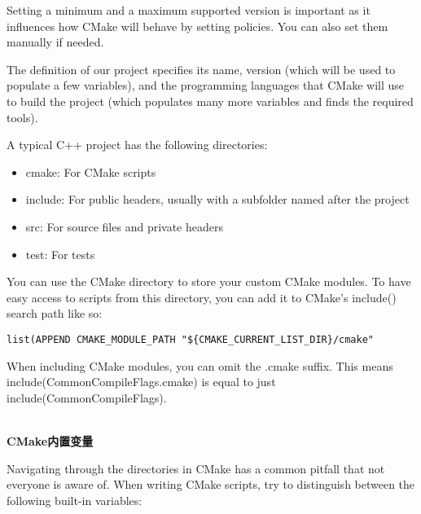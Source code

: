 Setting a minimum and a maximum supported version is important as it influences how CMake will behave by setting policies. You can also set them manually if needed.

The definition of our project specifies its name, version (which will be used to populate a few variables), and the programming languages that CMake will use to build the project (which populates many more variables and finds the required tools).

A typical C++ project has the following directories:

\begin{itemize}
\item 
cmake: For CMake scripts

\item 
include: For public headers, usually with a subfolder named after the project

\item 
src: For source files and private headers

\item 
test: For tests
\end{itemize}

You can use the CMake directory to store your custom CMake modules. To have easy access to scripts from this directory, you can add it to CMake's include() search path like so:

\begin{lstlisting}[style=styleCMake]
list(APPEND CMAKE_MODULE_PATH "${CMAKE_CURRENT_LIST_DIR}/cmake"
\end{lstlisting}

When including CMake modules, you can omit the .cmake suffix. This means include(CommonCompileFlags.cmake) is equal to just
include(CommonCompileFlags).

\hspace*{\fill} \\ %
\noindent
\textbf{CMake内置变量}

Navigating through the directories in CMake has a common pitfall that not everyone is aware of. When writing CMake scripts, try to distinguish between the following built-in variables:

